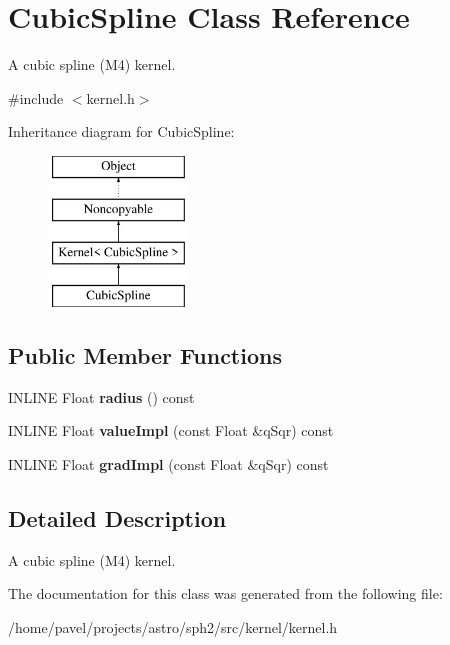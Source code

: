 \hypertarget{classCubicSpline}{}\section{Cubic\+Spline Class Reference}
\label{classCubicSpline}


A cubic spline (M4) kernel.  




{\ttfamily \#include $<$kernel.\+h$>$}

Inheritance diagram for Cubic\+Spline\+:\begin{figure}[H]
\begin{center}
\leavevmode
\includegraphics[height=4.000000cm]{classCubicSpline}
\end{center}
\end{figure}
\subsection*{Public Member Functions}
\begin{DoxyCompactItemize}
\item 
\hypertarget{classCubicSpline_abb48f59e3708ac00f1dbb10b5a34307d}{}\label{classCubicSpline_abb48f59e3708ac00f1dbb10b5a34307d} 
I\+N\+L\+I\+NE Float {\bfseries radius} () const
\item 
\hypertarget{classCubicSpline_ad3704f560df9a5dda63d249e38413f74}{}\label{classCubicSpline_ad3704f560df9a5dda63d249e38413f74} 
I\+N\+L\+I\+NE Float {\bfseries value\+Impl} (const Float \&q\+Sqr) const
\item 
\hypertarget{classCubicSpline_ab88666d41a68234882a028cba969551a}{}\label{classCubicSpline_ab88666d41a68234882a028cba969551a} 
I\+N\+L\+I\+NE Float {\bfseries grad\+Impl} (const Float \&q\+Sqr) const
\end{DoxyCompactItemize}


\subsection{Detailed Description}
A cubic spline (M4) kernel. 

The documentation for this class was generated from the following file\+:\begin{DoxyCompactItemize}
\item 
/home/pavel/projects/astro/sph2/src/kernel/kernel.\+h\end{DoxyCompactItemize}
